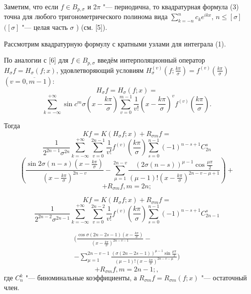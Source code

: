 Заметим, что если $f \in B_{p, \sigma}$ и 2$\pi$ "--- периодична, то квадратурная формула (3) точна для любого тригонометрического полинома вида $\sum_{k=-n}^{n} c_k e^{i k x}$, $n \leqslant [\sigma]$ $([\sigma]$ "--- целая часть $\sigma$ ) (см. [5]).

Рассмотрим квадратурную формулу с кратными узлами для интеграла (1).

По аналогии с [6] для $f \in B_{p,\sigma}$ введём интерполяционный оператор $H_\sigma f = H_\sigma (f;x)$, удовлетворяющий условиям $H_{\sigma} ^{(v)} \left(f ; \frac{k \pi}{\sigma}\right) = f^{(v)} \left(\frac{k\pi}{\sigma}\right)$ $(v = \overline{0, m-1})$:
$$ H_\sigma f = H_\sigma \left(f;x\right) = $$
$$\sum_{k=-\infty}^{+\infty} \sin{c^m \sigma} \left( x - \frac{k \pi}{\sigma} \right) \sum_{v=0}^{m-1} \frac{1}{v!} \left(x - \frac{k\pi}{\sigma} \right)^v f^{(v)} \left( \frac{k \pi}{\sigma}\right). $$

Тогда $$ Kf = K \left(H_\sigma f;x \right) + R_{\sigma m}f =$$
$$ \frac{1}{2^{2n-1}\sigma^{2n}} \sum_{k=-\infty}^{+\infty} \sum_{v=0}^{2n-1} \frac{1}{v!} f^{(v)} \left(\frac{k \pi}{\sigma}\right) \sum_{s=0}^{n-1} \left(-1 \right)^{n-s+1} C_{2n}^s $$
$$\left( \frac{\sin{2\sigma}(n-s) \left(x-\frac{k \pi}{\sigma}
\right)}{\left(x-\frac{k \pi}{\sigma}\right)^{2n-v}}
- \sum_{\mu = 1}^{2n-v} \frac{\left(2 \sigma (n-s) \right)^{\mu-1} \cos{\frac{\mu \pi }{2}}}{(\mu - 1)! \left(x - \frac{k \pi}{\sigma}\right)^{2n-v-\mu+1}} \right) + $$
$$ + R_{\sigma m} f, m = 2n;$$

$$ Kf = K \left(H_\sigma f;x \right) + R_{\sigma m}f = $$
$$ \frac{1}{2^{2n-2}\sigma^{2n-1}} \sum_{k=-\infty}^{+\infty} \sum_{v=0}^{2n-2} \frac{1}{v!} f^{(v)} \left(\frac{k \pi}{\sigma}\right) \sum_{s=0}^{n-1} \left(-1 \right)^{n-s+1} C_{2n-1}^s  $$

\begin{equation*}
    \begin{gathered}
        \bigg( \frac{\cos{\sigma}(2n-2s-1) \left(x-\frac{k \pi}{\sigma}\right)}{\left(x-\frac{k \pi}{\sigma}\right)^{2n-v-1}} - \\
        - \sum_{\mu = 1}^{2n-v-1} \frac{\left(\sigma (2n-2s-1) \right)^{\mu-1} \sin{\frac{\mu \pi }{2}}}{(\mu - 1)! \left(x - \frac{k \pi}{\sigma}\right)^{2n-v-\mu}} \bigg)
    \end{gathered}
\end{equation*}
$$ + R_{\sigma m} f, m = 2n-1;,$$
где $C_n^k$ "--- биноминальные коэффициенты, а $R_{\sigma m} f = R_{\sigma m}(f;x)$ "--- остаточный член.

